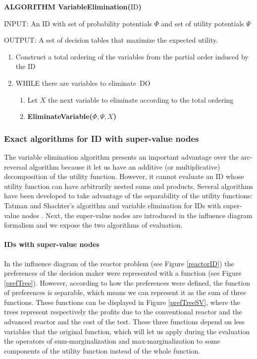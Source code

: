 \noindent \textsf{\textbf{ALGORITHM VariableElimination(}ID\textbf{)}}

\bigskip \noindent INPUT: An ID with set of probability potentials $\Phi $
and set of utility potentials $\Psi $

\noindent OUTPUT: A set of decision tables that maximize the expected
utility.

\begin{enumerate}
\item Construct a total ordering of the variables from the partial order
induced by the ID

\item WHILE there are variables to eliminate{\normalsize \ }DO

\begin{enumerate}
\item Let $X$ the next variable to eliminate according to the total ordering

\item \textsf{\textbf{EliminateVariable(}}$\Phi ,\Psi ,X$\textsf{\textbf{)}}
\end{enumerate}
\end{enumerate}

\subsubsection{Exact algorithms for ID with super-value nodes}

The variable elimination algorithm presents an important advantage over the
arc-reversal algorithm because it let us have an additive (or
multiplicative) decomposition of the utility function. However, it cannot
evaluate an ID whose utility function can have arbitrarily nested sums and
products. Several algorithms have been developed to take advantage of the
separability of the utility functions: Tatman and Shachter's algorithm \cite%
{tatman90} and variable elimination for IDs with super-value nodes \cite%
{luque04}. Next, the super-value nodes are introduced in the influence
diagram formalism and we expose the two algorithms of evaluation.

\paragraph{IDs with super-value nodes}

In the influence diagram of the reactor problem (see Figure \ref{reactorID})
the preferences of the decision maker were represented with a function (see
Figure \ref{prefTree}). However, according to how the preferences were
defined, the function of preferences is separable, which means we can
represent it as the sum of three functions. These functions can be displayed
in Figure \ref{prefTreeSV}, where the trees represent respectively the
profits due to the conventional reactor and the advanced reactor and the
cost of the test. These three functions depend on less variables that the
original function, which will let us apply during the evaluation the
operators of sum-marginalization and max-marginalization to some components
of the utility function instead of the whole function.

